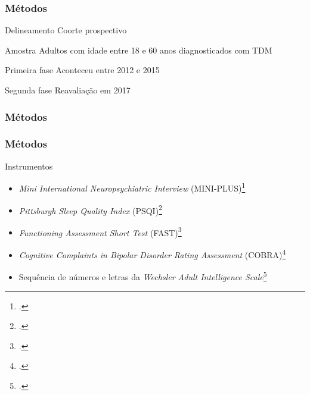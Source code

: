 \documentclass{beamer}
\begin{document}
\begin{frame}
\frametitle{Métodos}

    \begin{block}{Delineamento}
        Coorte prospectivo
    \end{block}

    \begin{block}{Amostra}
        Adultos com idade entre 18 e 60 anos diagnosticados com TDM
    \end{block}

    \begin{block}{Primeira fase}
        Aconteceu entre 2012 e 2015
    \end{block}

    \begin{block}{Segunda fase}
        Reavaliação em 2017
    \end{block}

\end{frame}

\begin{frame}
\frametitle{Métodos}


    \centering

\end{frame}

\begin{frame}
\frametitle{Métodos}

    \begin{block}{Instrumentos}
        \begin{itemize}
            \item \emph{Mini International Neuropsychiatric Interview} (MINI-PLUS)\footcite{amorim_mini_2000}
            \item \emph{Pittsburgh Sleep Quality Index} (PSQI)\footcite{bertolazi_validation_2011}
            \item \emph{Functioning Assessment Short Test} (FAST)\footcite{cacilhas_validity_2009}
            \item \emph{Cognitive Complaints in Bipolar Disorder Rating Assessment} (COBRA)\footcite{lima_validity_2018}
            \item Sequência de números e letras da \emph{Wechsler Adult Intelligence Scale}\footcite{wechsler_wais_2004}
        \end{itemize}
    \end{block}

\end{frame}
\end{document}
